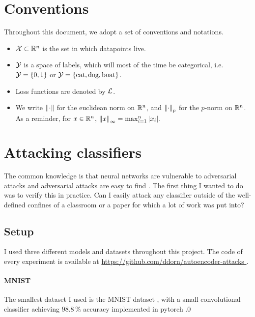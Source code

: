 \documentclass[]{scrarticle}
\begin{document}
  \clearpage
  \tableofcontents

\clearpage
\section*{Conventions}

Throughout this document, we adopt a set of conventions and notations.
\begin{itemize}
  \item $\mathcal X \subset \mathbb R^n$ is the set in which datapoints live.
  \item $\mathcal Y$ is a space of labels, which will most of the time be categorical,
    i.e. $\mathcal Y = \left\{ 0, 1 \right\}$ or $\mathcal Y = \left\{ \text{cat}, \text{dog}, \text{boat} \right\}$.
  \item Loss functions are denoted by $\mathcal L$.
  \item We write $\left\| \cdot \right\|$ for the euclidean norm on $\mathbb R^n$,
    and $\left\| \cdot \right\|_p$ for the $p$-norm on $\mathbb R^n$.
    As a reminder, for $x \in \mathbb R^n$, $\left\| x \right\|_\infty = \max_{i=1}^n \left| x_i \right|$.
\end{itemize}


\clearpage

\section{Attacking classifiers}
The common knowledge is that neural networks are vulnerable to adversarial attacks
and adversarial attacks are easy to find \cite{szegedy2013intriguing,goodfellow2014explaining,liu2021survey}.
The first thing I wanted to do was to verify this in practice. Can I easily
attack any classifier outside of the well-defined confines of a classroom
or a paper for which a lot of work was put into?

\subsection{Setup}
I used three different models and datasets throughout this project.
The code of every experiment is available at \url{
  https://github.com/ddorn/autoencoder-attacks
}.

\paragraph{MNIST}
The smallest dataset I used is the MNIST dataset \cite{LeCun1998GradientbasedLA},
with a small convolutional classifier achieving $98.8\,\%$ accuracy implemented in pytorch \cite{tuomaso2022trainmnistfast}.0
\end{document}
